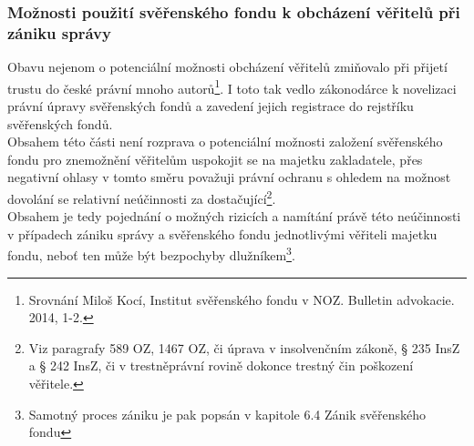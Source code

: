 \documentclass{article}
\begin{document}


\subsubsection{Možnosti použití svěřenského fondu k obcházení věřitelů při zániku správy}

Obavu nejenom o potenciální možnosti obcházení věřitelů zmiňovalo při přijetí trustu do české právní mnoho autorů\footnote{Srovnání Miloš Kocí, Institut svěřenského fondu v NOZ. Bulletin advokacie. 2014, 1-2.}. I toto tak vedlo zákonodárce k novelizaci právní úpravy svěřenských fondů a zavedení jejich registrace do rejstříku svěřenských fondů.\\

Obsahem této části není rozprava o potenciální možnosti založení svěřenského fondu pro znemožnění věřitelům uspokojit se na majetku zakladatele, přes negativní ohlasy v tomto směru považuji právní ochranu s ohledem na možnost dovolání se relativní neúčinnosti za dostačující\footnote{Viz paragrafy 589 OZ, 1467 OZ, či úprava v insolvenčním zákoně, § 235 InsZ a § 242 InsZ, či v trestněprávní rovině dokonce trestný čin poškození věřitele.}.\\

Obsahem je tedy pojednání o možných rizicích a namítání právě této neúčinnosti v případech zániku správy a svěřenského fondu jednotlivými věřiteli majetku fondu, neboť ten může být bezpochyby dlužníkem\footnote{Samotný proces zániku je pak popsán v kapitole 6.4 Zánik svěřenského fondu}.\\
\end{document}
